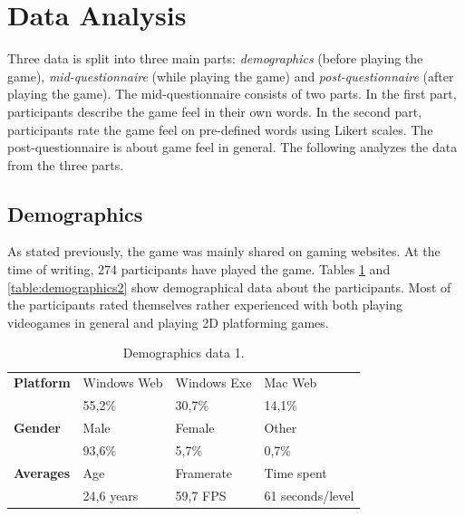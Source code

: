 \section{Data Analysis} \label{data}
Three data is split into three main parts: \textit{demographics} (before playing the game), \textit{mid-questionnaire} (while playing the game) and \textit{post-questionnaire} (after playing the game). The mid-questionnaire consists of two parts. In the first part, participants describe the game feel in their own words. In the second part, participants rate the game feel on pre-defined words using Likert scales. The post-questionnaire is about game feel in general. The following analyzes the data from the three parts.

\subsection{Demographics}
As stated previously, the game was mainly shared on gaming websites. At the time of writing, 274 participants have played the game. Tables \ref{table:demographics1} and \ref{table:demographics2} show demographical data about the participants. Most of the participants rated themselves rather experienced with both playing videogames in general and playing 2D platforming games.

\begin{table}[htbp]
\scriptsize
\centering
\begin{tabular}{|l|l|l|l|}
\hline
\textbf{Platform} & Windows Web & Windows Exe & Mac Web \\
                  & 55,2\%      & 30,7\%      & 14,1\%  \\
\hline
\textbf{Gender}   & Male        & Female      & Other   \\
                  & 93,6\%      & 5,7\%       & 0,7\%   \\
\hline
\textbf{Averages}      & Age     & Framerate            & Time spent        \\
                  & 24,6 years  & 59,7 FPS           & 61 seconds/level        \\
\hline
\end{tabular}
\caption{Demographics data 1.}
\label{table:demographics1}
\end{table}

